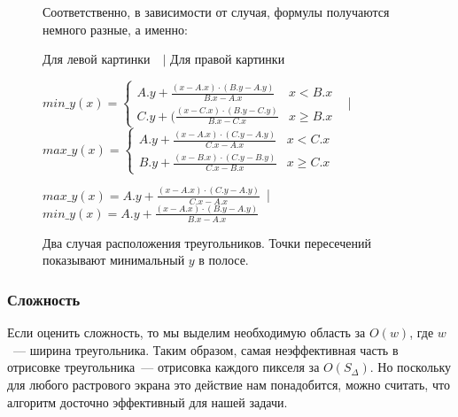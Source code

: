 \documentclass{article}
\begin{document}
\begin{center}
\begin{figure}[H]
\caption{Два случая расположения треугольников. Точки пересечений показывают минимальный $y$ в полосе.}
\label{ris:image}
Соответственно, в зависимости от случая, формулы получаются немного разные, а именно:

Для левой картинки~~$\bigg|$ Для правой картинки

$min\_y(x) = \begin{cases} A.y + \frac{(x - A.x) \cdot (B.y - A.y)}{B.x - A.x} & x < B.x \\ C.y + (\frac{(x - C.x)\cdot (B.y - C.y)}{B.x - C.x} & x \ge B.x\end{cases}$ 
~\bigg|~
$max\_y(x) = \begin{cases} A.y + \frac{(x - A.x) \cdot(C.y - A.y)}{C.x - A.x} & x < C.x \\ B.y + \frac{(x - B.x) \cdot(C.y - B.y)}{C.x - B.x} & x \ge C.x\end{cases}$ 

$max\_y(x) = A.y + \frac{(x - A.x) \cdot(C.y - A.y)}{C.x - A.x}$~\bigg|~$min\_y(x) = A.y + \frac{(x - A.x) \cdot (B.y - A.y)}{B.x - A.x}$
\end{figure}
\end{center}


\subsubsection{Сложность}

Если оценить сложность, то мы выделим необходимую область за $O(w)$, где $w$~--- ширина треугольника. Таким образом, самая неэффективная часть в отрисовке треугольника~--- отрисовка каждого пикселя за $O(S_{\Delta})$. Но поскольку для любого растрового экрана это действие нам понадобится, можно считать, что алгоритм досточно эффективный для нашей задачи.


\newpage
\end{document}
